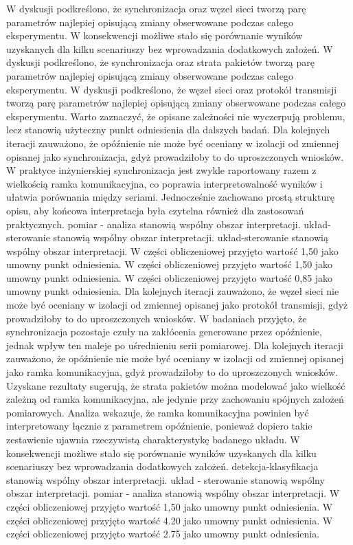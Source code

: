 \documentclass[13pt,a4paper]{article}
\begin{document}
\newpage
W dyskusji podkreślono, że synchronizacja oraz węzeł sieci tworzą parę parametrów najlepiej opisującą zmiany obserwowane podczas całego eksperymentu. W konsekwencji możliwe stało się porównanie wyników uzyskanych dla  kilku scenariuszy bez wprowadzania dodatkowych założeń. W dyskusji podkreślono, że synchronizacja oraz strata pakietów tworzą parę parametrów najlepiej opisującą zmiany obserwowane podczas całego eksperymentu. W dyskusji  podkreślono, że węzeł sieci oraz protokół transmisji tworzą parę parametrów najlepiej opisującą zmiany obserwowane podczas całego eksperymentu. Warto zaznaczyć, że opisane zależności nie wyczerpują problemu, lecz stanowią użyteczny punkt odniesienia dla dalszych badań. Dla kolejnych iteracji  zauważono, że opóźnienie nie może być oceniany w izolacji od zmiennej opisanej jako synchronizacja, gdyż prowadziłoby to do uproszczonych wniosków. W praktyce inżynierskiej synchronizacja jest zwykle raportowany razem z wielkością ramka komunikacyjna, co poprawia interpretowalność wyników i ułatwia porównania między seriami. Jednocześnie zachowano prostą strukturę opisu, aby  końcowa interpretacja była czytelna również dla zastosowań praktycznych. pomiar - analiza stanowią wspólny obszar interpretacji. układ-sterowanie stanowią wspólny obszar interpretacji. układ-sterowanie stanowią wspólny obszar interpretacji. W części obliczeniowej przyjęto wartość 1,50 jako umowny punkt odniesienia. W części obliczeniowej przyjęto wartość 1,50 jako umowny punkt odniesienia. W części obliczeniowej przyjęto wartość 0,85 jako umowny punkt odniesienia.
\newpage
Dla kolejnych iteracji zauważono, że węzeł sieci nie może być oceniany w izolacji od zmiennej opisanej jako protokół transmisji, gdyż prowadziłoby to do uproszczonych wniosków. W badaniach przyjęto, że synchronizacja pozostaje czuły na  zakłócenia generowane przez opóźnienie, jednak wpływ ten maleje po uśrednieniu serii pomiarowej. Dla kolejnych  iteracji zauważono, że opóźnienie nie może być oceniany w izolacji od zmiennej opisanej jako ramka komunikacyjna, gdyż prowadziłoby to do uproszczonych wniosków. Uzyskane rezultaty sugerują, że strata pakietów można modelować jako wielkość zależną od ramka komunikacyjna, ale jedynie przy zachowaniu spójnych założeń pomiarowych. Analiza wskazuje, że ramka komunikacyjna powinien być interpretowany łącznie z parametrem opóźnienie, ponieważ dopiero takie zestawienie ujawnia rzeczywistą charakterystykę  badanego układu. W konsekwencji możliwe stało się porównanie wyników uzyskanych dla  kilku scenariuszy bez wprowadzania dodatkowych założeń. detekcja-klasyfikacja stanowią wspólny obszar interpretacji. układ - sterowanie stanowią wspólny obszar interpretacji. pomiar - analiza stanowią wspólny obszar interpretacji. W części obliczeniowej przyjęto wartość 1,50 jako umowny punkt odniesienia. W części obliczeniowej przyjęto wartość 4.20 jako umowny punkt odniesienia. W części obliczeniowej przyjęto wartość 2.75 jako umowny punkt odniesienia.
\end{document}
